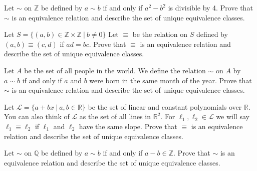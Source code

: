 
\newcommand{\Q}{\mathbb{Q}}
\newcommand{\R}{\mathbb{R}}
\newcommand{\Z}{\mathbb{Z}}

	
Let $\sim$ on $\Z$ be defined by $a\sim b$ if and only if $a^2-b^2$ is divisible by 4. Prove that $\sim$ is an equivalence relation and describe the set of unique equivalence classes.
	

Let $S=\{(a,b)\in\Z\times\Z\ |\ b\neq 0\}$ Let $\equiv$ be the relation on $S$ defined by $(a,b)\equiv (c,d)$ if $ad=bc$. Prove that $\equiv$ is an equivalence relation and describe the set of unique equivalence classes.
	

Let $A$ be the set of all people in the world. We define the relation $\sim$ on $A$ by $a\sim b$ if and only if $a$ and $b$ were born in the same month of the year.  Prove that $\sim$ is an equivalence relation and describe the set of unique equivalence classes.
	

Let $\mathcal{L}=\{a+bx\ |\ a,b\in\R\}$ be the set of linear and constant polynomials over $\R$. You can also think of $\mathcal{L}$ as the set of all lines in $\R^2$.  For $\ell_1,\ell_2\in \mathcal{L}$ we will say $\ell_1\equiv \ell_2$ if $\ell_1$ and $\ell_2$ have the same slope.  Prove that $\equiv$ is an equivalence relation and describe the set of unique equivalence classes.
	

Let $\sim$ on $\Q$ be defined by $a\sim b$ if and only if $a-b\in\Z$. Prove that $\sim$ is an equivalence relation and describe the set of unique equivalence classes.